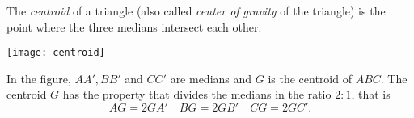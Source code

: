 \documentclass[12pt]{article}
\begin{document}
The \emph{centroid} of a triangle (also called \emph{center of gravity} of 
the triangle) is the point where the three medians intersect each other.

\begin{center}
\texttt{[image: centroid]}
\end{center}

In the figure, $AA', BB'$ and $CC'$ are medians and $G$ is the centroid of $ABC$.
The centroid $G$ has the property that divides the medians in the ratio $2:1$, that is 
$$AG=2GA'\quad BG=2GB'\quad CG=2GC'.$$
\end{document}
